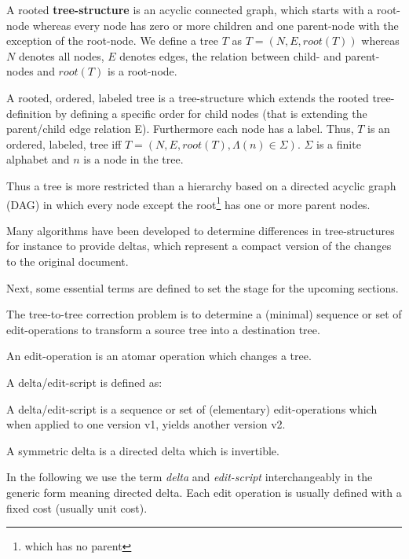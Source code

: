 \begin{mydef}
A rooted \textbf{tree-structure} is an acyclic connected graph, which starts with a root-node whereas every node has zero or more children and one parent-node with the exception of the root-node. We define a tree $T$ as $T = (N, E, root(T))$ whereas $N$ denotes all nodes, $E$ denotes edges, the relation between child- and parent-nodes and $root(T)$ is a root-node.
\end{mydef}

\begin{mydef}
A rooted, ordered, labeled tree is a tree-structure which extends the rooted tree-definition by defining a specific order for child nodes (that is extending the parent/child edge relation E). Furthermore each node has a label. Thus, $T$ is an ordered, labeled, tree iff $T = (N, E, root(T), \Lambda(n) \in \Sigma)$. $\Sigma$ is a finite alphabet and $n$ is a node in the tree.
\end{mydef}

Thus a tree is more restricted than a hierarchy based on a directed acyclic graph (DAG) in which every node except the root\footnote{which has no parent} has one or more parent nodes.

Many algorithms have been developed to determine differences in tree-structures for instance to provide deltas, which represent a compact version of the changes to the original document.

Next, some essential terms are defined to set the stage for the upcoming sections.

The tree-to-tree correction problem is to determine a (minimal) sequence or set of edit-operations to transform a source tree into a destination tree. 

\begin{mydef}
An edit-operation is an atomar operation which changes a tree.
\end{mydef}

A delta/edit-script is defined as:

\begin{mydef}
A delta/edit-script is a sequence or set of (elementary) edit-operations which when applied to one version v1, yields another version v2.
\end{mydef}

\begin{mydef}
A symmetric delta is a directed delta which is invertible.
\end{mydef}

In the following we use the term \emph{delta} and \emph{edit-script} interchangeably in the generic form meaning directed delta. Each edit operation is usually defined with a fixed cost (usually unit cost).

